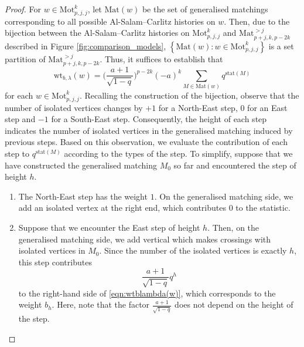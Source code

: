 \documentclass{amsart}
\newcommand{\set}[1]{\left\{#1\right\}}
\theoremstyle{plain}
\theoremstyle{remark}
\numberwithin{equation}{section}
\begin{document}
\begin{proof}
    For $w\in\mathrm{Mot}_{p,j,j}^{k}$, let $\mathrm{Mat}(w)$ be the set of generalised matchings corresponding to all possible Al-Salam--Carlitz histories on $w$. Then, due to the bijection between the Al-Salam--Carlitz histories on $\mathrm{Mot}_{p,j,j}^{k}$ and ${\mathrm{Mat}}^{>j}_{p+j,k,p-2k}$ described in Figure \ref{fig:comparison_models}, $\set{\mathrm{Mat}(w):w\in \mathrm {Mot}_{p,j,j}^{k}}$ is a set partition of $\mathrm{Mat}_{p+j,k,p-2k}^{>j}$. Thus, it suffices to establish that
    \begin{equation}\label{eqn:wtblambda(w)}
        \mathrm{wt}_{b,\lambda}(w)=\Big(\frac{a+1}{\sqrt{1-q}}\Big)^{p-2k}(-a)^{k}\sum_{M\in \mathrm{Mat}(w)}q^{\mathrm{stat}(M)}
    \end{equation}
    for each $w\in \mathrm{Mot}_{p,j,j}^{k}$. Recalling the construction of the bijection, observe that the number of isolated vertices changes by $+1$ for a North-East step, $0$ for an East step and $-1$ for a South-East step. Consequently, the height of each step indicates the number of isolated vertices in the generalised matching induced by previous steps. Based on this observation, we evaluate the contribution of each step to $q^{\mathrm{stat}(M)}$ according to the types of the step. To simplify, suppose that we have constructed the generalised matching $M_0$ so far and encountered the step of height $h$.
    \begin{enumerate}
        \item The North-East step has the weight $1$. On the generalised matching side, we add an isolated vertex at the right end, which contributes $0$ to the statistic. \smallskip 
        \item Suppose that we encounter the East step of height $h$. Then, on the generalised matching side, we add vertical which makes crossings with isolated vertices in $M_0$. Since the number of the isolated vertices is exactly $h$, this step contributes
        \begin{equation*}
            \frac{a+1}{\sqrt{1-q}}q^{h}
        \end{equation*}
        to the right-hand side of \eqref{eqn:wtblambda(w)}, which corresponds to the weight $b_h$. Here, note that the factor $\frac{a+1}{\sqrt{1-q}}$ does not depend on the height of the step. \smallskip 

\end{enumerate}
\end{proof}
\end{document}
